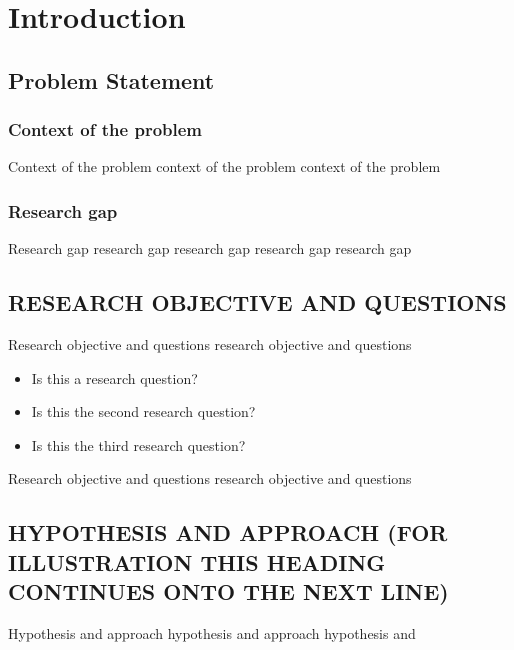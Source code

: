 
\chapter{Introduction}

\section{Problem Statement}

\nocite{Shannon:A_Mathematical_Theory_of_Communications}

\subsection{Context of the problem}

Context of the problem context of the problem context of the problem


\subsection{Research gap}

Research gap research gap research gap research gap research gap


\section{RESEARCH OBJECTIVE AND QUESTIONS}

Research objective and questions research objective and questions

\begin{itemize}
\item Is this a research question?
\item Is this the second research question?
\item Is this the third research question?
\end{itemize}

Research objective and questions research objective and questions

\section{HYPOTHESIS AND APPROACH (FOR ILLUSTRATION THIS HEADING
  CONTINUES ONTO THE NEXT LINE)}

Hypothesis and approach hypothesis and approach hypothesis and

